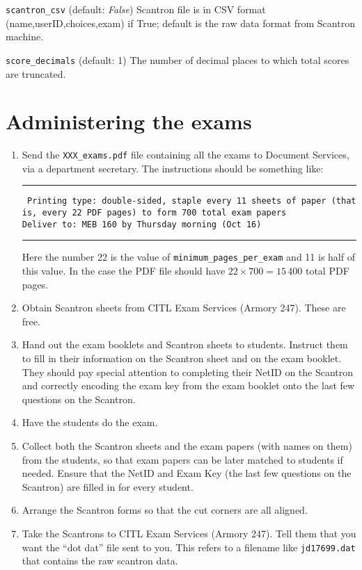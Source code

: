 \documentclass{article}
\begin{document}
\hangindent=1cm \texttt{scantron_csv} (default: \emph{False})
Scantron file is in CSV format (name,userID,choices,exam) if True; default
is the raw data format from Scantron machine.

\hangindent=1cm \texttt{score_decimals} (default: 1)
The number of decimal places to which total scores are truncated.

\section{Administering the exams}

\begin{enumerate}
\item Send the \texttt{XXX_exams.pdf} file
  containing all the exams to Document Services, via a department
  secretary. The instructions should be something like:

  \rule{\linewidth}{0.5pt}

  \parbox{\linewidth}{
    \tt
    Printing type: double-sided, staple every 11 sheets of paper (that is, every 22 PDF pages) to form 700 total exam papers \\
    Deliver to: MEB 160 by Thursday morning (Oct 16)
  }

  \rule{\linewidth}{0.5pt}

  Here the number 22 is the value of \texttt{minimum_pages_per_exam} and
  11 is half of this value. In the case the PDF file should have $22
  \times 700 = 15\,400$ total PDF pages.
\item Obtain Scantron sheets from CITL Exam Services (Armory
  247). These are free.
\item Hand out the exam booklets and Scantron sheets to
  students. Instruct them to fill in their information on the Scantron
  sheet and on the exam booklet. They should pay special attention to
  completing their NetID on the Scantron and correctly encoding the
  exam key from the exam booklet onto the last few questions on the
  Scantron.
\item Have the students do the exam.
\item Collect both the Scantron sheets and the exam papers (with names
  on them) from the students, so that exam papers can be later matched
  to students if needed. Ensure that the NetID and Exam Key (the last
  few questions on the Scantron) are filled in for every student.
\item Arrange the Scantron forms so that the cut corners are all
  aligned.
\item Take the Scantrons to CITL Exam Services (Armory 247). Tell them
  that you want the ``dot dat'' file sent to you. This refers to a
  filename like \texttt{jd17699.dat} that contains the raw scantron
  data.
\end{enumerate}
\end{document}
